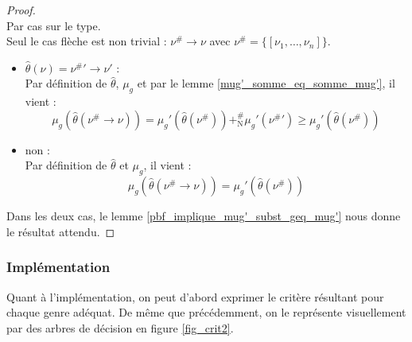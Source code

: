 \documentclass[a4paper]{report}
\newenvironment{preuve} 
	{\begin{proof}~\\} 
	{\end{proof}}
\theoremstyle{definition}
\newcommand{\mset}[1]{\{\![#1]\!\}}
\newcommand{\N}{\mathrm{N}}
\begin{document}
\begin{preuve}
	Par cas sur le type. \\
	Seul le cas flèche est non trivial : $\nu^\# \rightarrow \nu$ avec $\nu^\# = \mset{\nu_1, \dots, \nu_n}$.
	\begin{itemize}[label={\textbf{Si}}]
		\item
			$\hat\theta (\nu) = {\nu^\#}' \rightarrow \nu'$ : \\
			Par définition de $\hat\theta$, $\mu_g$ et par le lemme \ref{mug'_somme_eq_somme_mug'}, il vient :
			\[ \mu_g (\hat\theta (\nu^\# \rightarrow \nu)) = \mu_g' (\hat\theta (\nu^\#)) +^\#_\N \mu_g' ({\nu^\#}') \geqslant \mu_g' (\hat\theta (\nu^\#)) \]
		\item
			non : \\
			Par définition de $\hat\theta$ et $\mu_g$, il vient :
			\[ \mu_g (\hat\theta (\nu^\# \rightarrow \nu)) = \mu_g' (\hat\theta (\nu^\#)) \]
	\end{itemize}
	Dans les deux cas, le lemme \ref{pbf_implique_mug'_subst_geq_mug'} nous donne le résultat attendu.
\end{preuve}

\subsubsection{Implémentation}

Quant à l'implémentation, on peut d'abord exprimer le critère résultant pour chaque genre adéquat. De même que précédemment, on le représente visuellement par des arbres de décision en figure \ref{fig_crit2}.
\end{document}

